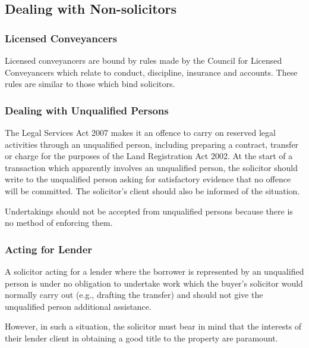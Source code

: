 \documentclass[
]{article}
\begin{document}
\hypertarget{dealing-with-non-solicitors}{%
\subsection{Dealing with
Non-solicitors}\label{dealing-with-non-solicitors}}

\hypertarget{licensed-conveyancers}{%
\subsubsection{Licensed Conveyancers}\label{licensed-conveyancers}}

Licensed conveyancers are bound by rules made by the Council for
Licensed Conveyancers which relate to conduct, discipline, insurance and
accounts. These rules are similar to those which bind solicitors.

\hypertarget{dealing-with-unqualified-persons}{%
\subsubsection{Dealing with Unqualified
Persons}\label{dealing-with-unqualified-persons}}

The Legal Services Act 2007 makes it an offence to carry on reserved
legal activities through an unqualified person, including preparing a
contract, transfer or charge for the purposes of the Land Registration
Act 2002. At the start of a transaction which apparently involves an
unqualified person, the solicitor should write to the unqualified person
asking for satisfactory evidence that no offence will be committed. The
solicitor's client should also be informed of the situation.

Undertakings should not be accepted from unqualified persons because
there is no method of enforcing them.

\hypertarget{acting-for-lender}{%
\subsubsection{Acting for Lender}\label{acting-for-lender}}

A solicitor acting for a lender where the borrower is represented by an
unqualified person is under no obligation to undertake work which the
buyer's solicitor would normally carry out (e.g., drafting the transfer)
and should not give the unqualified person additional assistance.

However, in such a situation, the solicitor must bear in mind that the
interests of their lender client in obtaining a good title to the
property are paramount.
\end{document}

